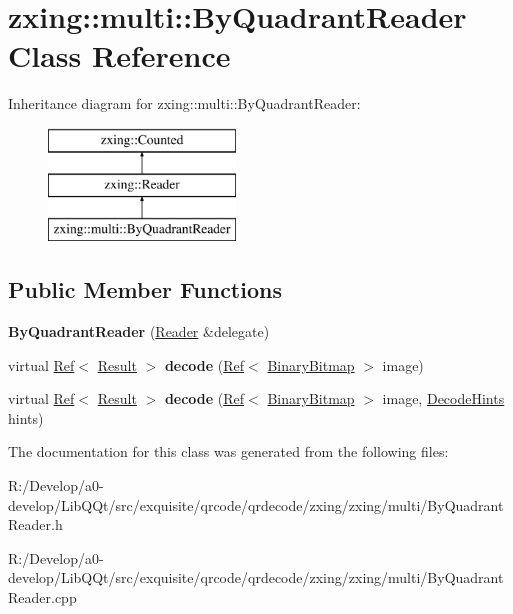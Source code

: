 \hypertarget{classzxing_1_1multi_1_1_by_quadrant_reader}{}\section{zxing\+:\+:multi\+:\+:By\+Quadrant\+Reader Class Reference}
\label{classzxing_1_1multi_1_1_by_quadrant_reader}
Inheritance diagram for zxing\+:\+:multi\+:\+:By\+Quadrant\+Reader\+:\begin{figure}[H]
\begin{center}
\leavevmode
\includegraphics[height=3.000000cm]{classzxing_1_1multi_1_1_by_quadrant_reader}
\end{center}
\end{figure}
\subsection*{Public Member Functions}
\begin{DoxyCompactItemize}
\item 
\mbox{\label{classzxing_1_1multi_1_1_by_quadrant_reader_a431618f84c792c4ece22c40c73c7df53}} 
{\bfseries By\+Quadrant\+Reader} (\mbox{\hyperlink{classzxing_1_1_reader}{Reader}} \&delegate)
\item 
\mbox{\label{classzxing_1_1multi_1_1_by_quadrant_reader_aecf2fbff1260456d19962df92972a20b}} 
virtual \mbox{\hyperlink{classzxing_1_1_ref}{Ref}}$<$ \mbox{\hyperlink{classzxing_1_1_result}{Result}} $>$ {\bfseries decode} (\mbox{\hyperlink{classzxing_1_1_ref}{Ref}}$<$ \mbox{\hyperlink{classzxing_1_1_binary_bitmap}{Binary\+Bitmap}} $>$ image)
\item 
\mbox{\label{classzxing_1_1multi_1_1_by_quadrant_reader_aed96b1a012d244ac0c759480d4f873c2}} 
virtual \mbox{\hyperlink{classzxing_1_1_ref}{Ref}}$<$ \mbox{\hyperlink{classzxing_1_1_result}{Result}} $>$ {\bfseries decode} (\mbox{\hyperlink{classzxing_1_1_ref}{Ref}}$<$ \mbox{\hyperlink{classzxing_1_1_binary_bitmap}{Binary\+Bitmap}} $>$ image, \mbox{\hyperlink{classzxing_1_1_decode_hints}{Decode\+Hints}} hints)
\end{DoxyCompactItemize}


The documentation for this class was generated from the following files\+:\begin{DoxyCompactItemize}
\item 
R\+:/\+Develop/a0-\/develop/\+Lib\+Q\+Qt/src/exquisite/qrcode/qrdecode/zxing/zxing/multi/By\+Quadrant\+Reader.\+h\item 
R\+:/\+Develop/a0-\/develop/\+Lib\+Q\+Qt/src/exquisite/qrcode/qrdecode/zxing/zxing/multi/By\+Quadrant\+Reader.\+cpp\end{DoxyCompactItemize}
